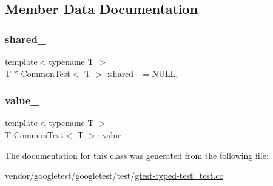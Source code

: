 \subsection{Member Data Documentation}
\mbox{\label{class_common_test_a52368ce1e65a865db9bdccbcc2cedaac}} 
\subsubsection{\texorpdfstring{shared\+\_\+}{shared\_}}
{\footnotesize\ttfamily template$<$typename T $>$ \\
T $\ast$ \hyperlink{class_common_test}{Common\+Test}$<$ T $>$\+::shared\+\_\+ = N\+U\+LL\hspace{0.3cm}{\ttfamily [static]}, {\ttfamily [protected]}}

\mbox{\label{class_common_test_ae59c4abcb833625a7baeb2048531ebec}} 
\subsubsection{\texorpdfstring{value\+\_\+}{value\_}}
{\footnotesize\ttfamily template$<$typename T $>$ \\
T \hyperlink{class_common_test}{Common\+Test}$<$ T $>$\+::value\+\_\+\hspace{0.3cm}{\ttfamily [protected]}}



The documentation for this class was generated from the following file\+:\begin{DoxyCompactItemize}
\item 
vendor/googletest/googletest/test/\hyperlink{gtest-typed-test__test_8cc}{gtest-\/typed-\/test\+\_\+test.\+cc}\end{DoxyCompactItemize}
